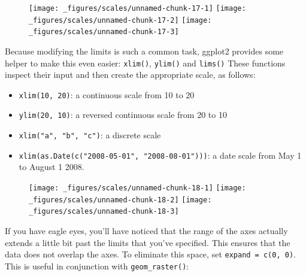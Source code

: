 \begin{figure}[H]
  \texttt{[image: \_figures/scales/unnamed-chunk-17-1]}%
  \texttt{[image: \_figures/scales/unnamed-chunk-17-2]}%
  \texttt{[image: \_figures/scales/unnamed-chunk-17-3]}
\end{figure}

Because modifying the limits is such a common task, ggplot2 provides
some helper to make this even easier: \texttt{xlim()}, \texttt{ylim()}
and \texttt{lims()} These functions inspect their input and then create
the appropriate scale, as follows:  

\begin{itemize}
\tightlist
\item
  \texttt{xlim(10,\ 20)}: a continuous scale from 10 to 20
\item
  \texttt{ylim(20,\ 10)}: a reversed continuous scale from 20 to 10
\item
  \texttt{xlim("a",\ "b",\ "c")}: a discrete scale
\item
  \texttt{xlim(as.Date(c("2008-05-01",\ "2008-08-01")))}: a date scale
  from May 1 to August 1 2008.
\end{itemize}

\begin{Shaded}
\begin{Highlighting}[]
\StringTok{ }\NormalTok{(}\NormalTok{, }\NormalTok{)}
\StringTok{ }\NormalTok{(}\NormalTok{, }\NormalTok{)}
\StringTok{ }\NormalTok{(} \NormalTok{(}\NormalTok{, }\NormalTok{))}
\end{Highlighting}
\end{Shaded}

\begin{figure}[H]
  \texttt{[image: \_figures/scales/unnamed-chunk-18-1]}%
  \texttt{[image: \_figures/scales/unnamed-chunk-18-2]}%
  \texttt{[image: \_figures/scales/unnamed-chunk-18-3]}
\end{figure}

If you have eagle eyes, you'll have noticed that the range of the axes
actually extends a little bit past the limits that you've specified.
This ensures that the data does not overlap the axes. To eliminate this
space, set \texttt{expand\ =\ c(0,\ 0)}. This is useful in conjunction
with \texttt{geom\_raster()}: 

